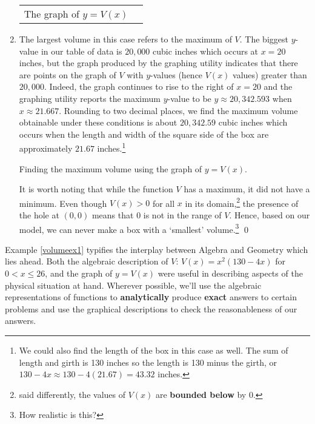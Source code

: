 \documentclass{ximera}
\begin{document}
\begin{example}
\begin{enumerate}
\begin{tabular}{m{1.9 in}m{4in}}
\centerline{The graph of $y = V(x)$}

\end{tabular}


\item  The largest volume in this case refers to the maximum of $V$.  The biggest $y$-value in our table of data is $20, \! 000$ cubic inches which occurs at $x = 20$ inches, but the graph produced by the graphing utility indicates that there are points on the graph of $V$ with $y$-values (hence $V(x)$ values) greater than $20, \! 000$.  Indeed, the graph continues to rise to the right of $x = 20$ and the graphing utility reports the maximum $y$-value to be $y \approx 20, \! 342.593$ when $x \approx 21.667$.  Rounding to two decimal places, we find the maximum volume obtainable under these conditions is about $20, \! 342.59$ cubic inches which occurs when the length and width of the square side of the box are approximately $21.67$ inches.\footnote{We could also find the length of the box in this case as well.  The sum of length and girth is 130 inches so the length is 130 minus the girth, or $130 - 4x \approx 130 - 4(21.67) = 43.32$ inches.}  

\begin{center}


Finding the maximum volume using the graph of $y = V(x)$.

\end{center}

 

It is worth noting that while the function $V$ has a maximum, it did not have a minimum.  Even though $V(x)>0$ for all $x$ in its domain,\footnote{said differently, the values of $V(x)$ are \textbf{bounded below} by $0$.} the presence of the hole at $(0,0)$ means that $0$ is not in the range of $V$.  Hence, based on our model, we can never make a box with a  `smallest' volume.\footnote{How realistic is this?}  \qed

\end{enumerate}
\end{example}

 

Example \ref{volumeex1} typifies the interplay between Algebra and Geometry which lies ahead.  Both the algebraic description of  $V$: $V(x) = x^2 (130 - 4x)$ for $0 < x \leq 26$, and the graph of $y=V(x)$ were useful in describing aspects of the physical situation at hand.  Wherever possible, we'll use the algebraic representations of functions to \textbf{analytically} produce \textbf{exact} answers to certain problems and use the graphical descriptions to check the reasonableness of our answers. 
\end{document}
